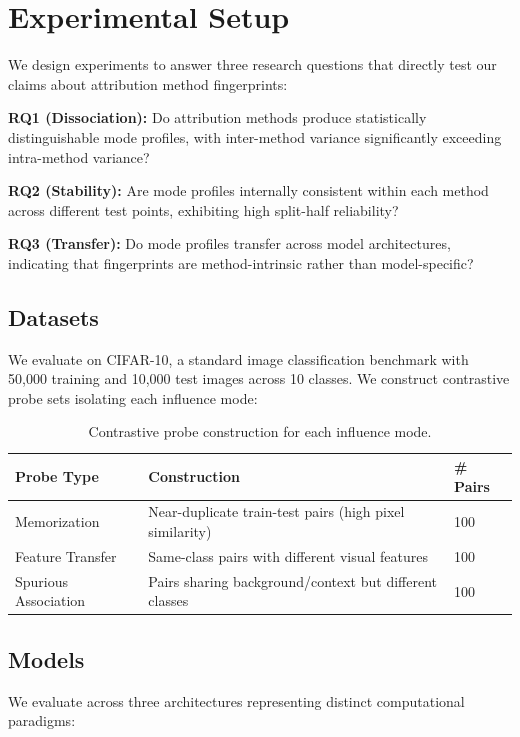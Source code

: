 \section{Experimental Setup}

We design experiments to answer three research questions that directly test our claims about attribution method fingerprints:

\textbf{RQ1 (Dissociation):} Do attribution methods produce statistically distinguishable mode profiles, with inter-method variance significantly exceeding intra-method variance?

\textbf{RQ2 (Stability):} Are mode profiles internally consistent within each method across different test points, exhibiting high split-half reliability?

\textbf{RQ3 (Transfer):} Do mode profiles transfer across model architectures, indicating that fingerprints are method-intrinsic rather than model-specific?

\subsection{Datasets}

We evaluate on CIFAR-10, a standard image classification benchmark with 50,000 training and 10,000 test images across 10 classes. We construct contrastive probe sets isolating each influence mode:

\begin{table}[h]
\centering
\begin{tabular}{@{}lll@{}}
\toprule
Probe Type & Construction & \# Pairs \\
\midrule
Memorization & Near-duplicate train-test pairs (high pixel similarity) & 100 \\
Feature Transfer & Same-class pairs with different visual features & 100 \\
Spurious Association & Pairs sharing background/context but different classes & 100 \\
\bottomrule
\end{tabular}
\caption{Contrastive probe construction for each influence mode.}
\label{tab:probes}
\end{table}

\subsection{Models}

We evaluate across three architectures representing distinct computational paradigms:

